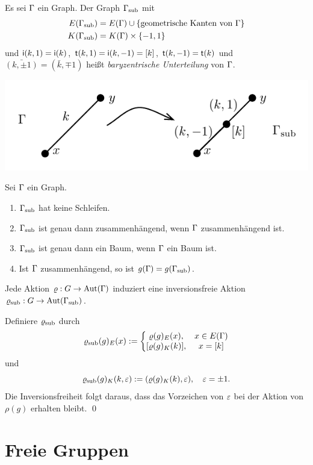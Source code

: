 \documentclass[a4paper, 12pt, twoside]{article}
\begin{document}
\DEF Es sei $\Gamma$ ein Graph. Der Graph $\Gamma_{\text{sub}}$ mit
\begin{align*}
E(\Gamma_{\text{sub}}) &= E(\Gamma)\cup\{\text{geometrische Kanten von }\Gamma\} \\
K(\Gamma_{\text{sub}}) &= K(\Gamma)\times\{-1,1\}
\end{align*}
und
$\mathsf{i}(k,1)=\mathsf{i}(k)$, $\mathsf{t}(k,1)=\mathsf{i}(k,-1)=[k]$,
$\mathsf{t}(k,-1)=\mathsf{t}(k)$ und $\bar{(k, \pm 1)}=(\bar{k},\mp 1)$
heißt \emph{baryzentrische Unterteilung}
von $\Gamma$.
\begin{center}
	\includegraphics{grugraImages/subdiv}
\end{center}

\BEM Sei $\Gamma$ ein Graph.
\begin{enumerate}
\item $\Gamma_{\text{sub}}$ hat keine Schleifen.
\item $\Gamma_{\text{sub}}$ ist genau dann zusammenhängend, wenn $\Gamma$
	zusammenhängend ist.
\item $\Gamma_{\text{sub}}$ ist genau dann ein Baum, wenn $\Gamma$ ein Baum ist.
\item Ist $\Gamma$ zusammenhängend, so ist $g(\Gamma)=g(\Gamma_{\text{sub}})$.
\end{enumerate}

\BEM Jede Aktion $\varrho:G\rightarrow\mathrm{Aut}(\Gamma)$ induziert eine inversionsfreie
Aktion $\varrho_{\text{sub}}:G\rightarrow\mathrm{Aut}(\Gamma_{\text{sub}})$.

\bew Definiere $\varrho_{\text{sub}}$ durch
\[
\rhosub(g)_E(x) :=
\left\{\begin{matrix}
\rho(g)_E(x), & x\in E(\GR) \\
[\rho(g)_K(k)], & x=[k]
\end{matrix}\right.
\]
und
\[
\varrho_{\text{sub}}(g)_K(k,\varepsilon) :=
(\varrho(g)_K(k),\varepsilon),
\quad \varepsilon=\pm 1.
\]
Die Inversionsfreiheit folgt daraus, dass das Vorzeichen von $\varepsilon$
bei der Aktion von $\rho(g)$ erhalten bleibt.
\qed

\section{Freie Gruppen}\label{sec_FG}
\end{document}
